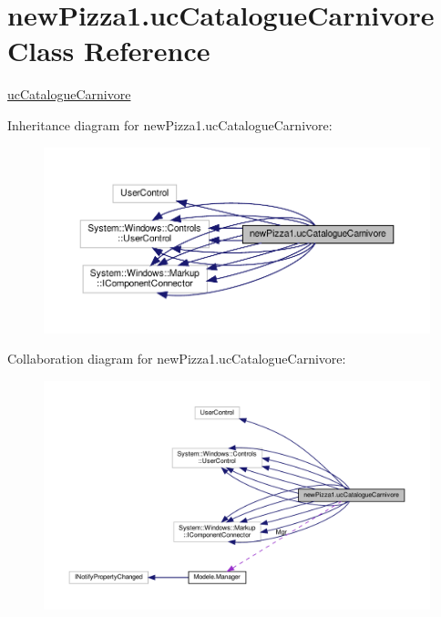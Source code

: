 \hypertarget{classnewPizza1_1_1ucCatalogueCarnivore}{}\section{new\+Pizza1.\+uc\+Catalogue\+Carnivore Class Reference}
\label{classnewPizza1_1_1ucCatalogueCarnivore}


\hyperlink{classnewPizza1_1_1ucCatalogueCarnivore}{uc\+Catalogue\+Carnivore}  




Inheritance diagram for new\+Pizza1.\+uc\+Catalogue\+Carnivore\+:
\nopagebreak
\begin{figure}[H]
\begin{center}
\leavevmode
\includegraphics[width=350pt]{classnewPizza1_1_1ucCatalogueCarnivore__inherit__graph}
\end{center}
\end{figure}


Collaboration diagram for new\+Pizza1.\+uc\+Catalogue\+Carnivore\+:
\nopagebreak
\begin{figure}[H]
\begin{center}
\leavevmode
\includegraphics[width=350pt]{classnewPizza1_1_1ucCatalogueCarnivore__coll__graph}
\end{center}
\end{figure}
